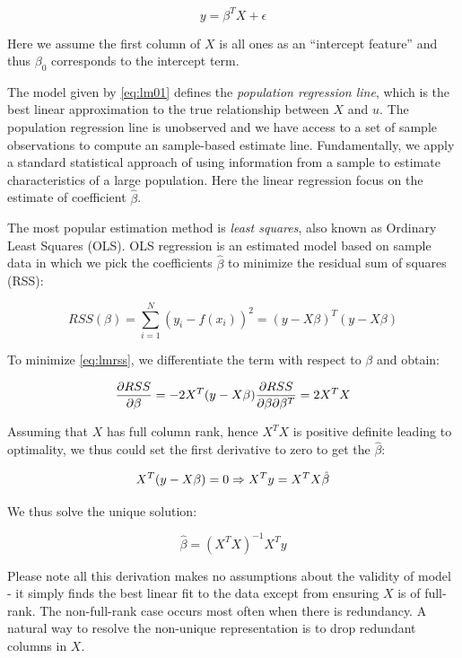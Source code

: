 \documentclass[
]{book}
\begin{document}
\begin{equation} 
y = \beta^T X + \epsilon  
\label{eq:lm01}
\end{equation}

Here we assume the first column of \(X\) is all ones as an ``intercept feature'' and thus \(\beta_0\) corresponds to the intercept term.

The model given by \eqref{eq:lm01} defines the {\emph{population regression line}}, which is the best linear approximation to the true relationship between \(X\) and \(u\). The population regression line is unobserved and we have access to a set of sample observations to compute an sample-based estimate line. Fundamentally, we apply a standard statistical approach of using information from a sample to estimate characteristics of a large population. Here the linear regression focus on the estimate of coefficient \(\hat{\beta}\).

The most popular estimation method is {\emph{least squares}}, also known as Ordinary Least Squares (OLS). OLS regression is an estimated model based on sample data in which we pick the coefficients \(\hat{\beta}\) to minimize the residual sum of squares (RSS):

\begin{equation} 
RSS(\beta) = \sum_{i=1}^N (y_i - f(x_i))^2 = (y-X\beta)^T (y-X \beta)  
\label{eq:lmrss}
\end{equation}

To minimize \eqref{eq:lmrss}, we differentiate the term with respect to \(\beta\) and obtain:

\[
\frac{\partial RSS}{\partial \beta} = -2X^T (y - X \beta) \\
\frac{\partial RSS}{\partial \beta \partial \beta^T} =  2 X^TX
\]

Assuming that \(X\) has full column rank, hence \(X^TX\) is positive definite leading to optimality, we thus could set the first derivative to zero to get the \(\hat{\beta}\):

\[
X^T (y - X \beta) = 0  \\
\Rightarrow  X^T y  =  X^T X \hat{\beta}
\]

We thus solve the unique solution:

\begin{equation} 
\hat{\beta} = (X^TX)^{-1} X^T y
\label{eq:lmbeta}
\end{equation}

Please note all this derivation makes no assumptions about the validity of model - it simply finds the best linear fit to the data except from ensuring \(X\) is of full-rank. The non-full-rank case occurs most often when there is redundancy. A natural way to resolve the non-unique representation is to drop redundant columns in \(X\).
\end{document}
